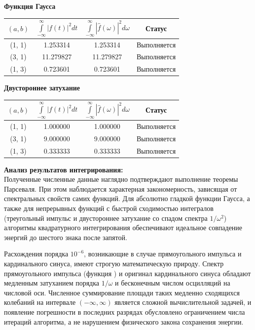\documentclass[a4paper,14pt]{extarticle}
\begin{document}
\textbf{Функция Гаусса}\\
\begin{center}
\begin{tabular}{|c|c|c|c|}
    \hline
    $(a, b)$& $\int\limits_{-\infty}^{\infty} |f(t)|^2 dt$ & $\int\limits_{-\infty}^{\infty}|\hat{f}(\omega)|^2d\omega$ & Статус\\
    \hline
    (1, 1)& 1.253314 & 1.253314 & Выполняется \\
      \hline
      (3, 1)& 11.279827 & 11.279827 & Выполняется \\
      \hline
      (1, 3)& 0.723601 & 0.723601 & Выполняется\\
      \hline
\end{tabular}
\end{center}

\newpage

\textbf{Двустороннее затухание}\\
\begin{center}
\begin{tabular}{|c|c|c|c|}
    \hline
     $(a, b)$& $\int\limits_{-\infty}^{\infty} |f(t)|^2 dt$ & $\int\limits_{-\infty}^{\infty}|\hat{f}(\omega)|^2d\omega$ & Статус\\
     \hline
     (1, 1)& 1.000000 & 1.000000 & Выполняется \\
      \hline
      (3, 1)& 9.000000 & 9.000000 & Выполняется \\
      \hline
      (1, 3)& 0.333333 & 0.333333 & Выполняется\\
      \hline
\end{tabular}
\end{center}

\textbf{Анализ результатов интегрирования:}\\
Полученные численные данные наглядно подтверждают выполнение теоремы Парсеваля. При этом наблюдается характерная закономерность, зависящая от спектральных свойств самих функций. Для абсолютно гладкой функции Гаусса, а также для непрерывных функций с быстрой сходимостью интегралов (треугольный импульс и двустороннее затухание со спадом спектра $1/\omega^2$) алгоритмы квадратурного интегрирования обеспечивают идеальное совпадение энергий до шестого знака после запятой.

Расхождения порядка $10^{-6}$, возникающие в случае прямоугольного импульса и 
кардинального синуса, имеют строгую математическую природу. Спектр прямоугольного импульса 
(функция ) и оригинал кардинального синуса обладают медленным затуханием порядка 
$1/\omega$ и бесконечным числом осцилляций на числовой оси. Численное суммирование площади таких 
медленно сходящихся колебаний на интервале $(-\infty, \infty)$ является сложной вычислительной 
задачей, и появление погрешности в последних разрядах обусловлено ограничением числа итераций 
алгоритма, а не нарушением физического закона сохранения энергии.
\end{document}
